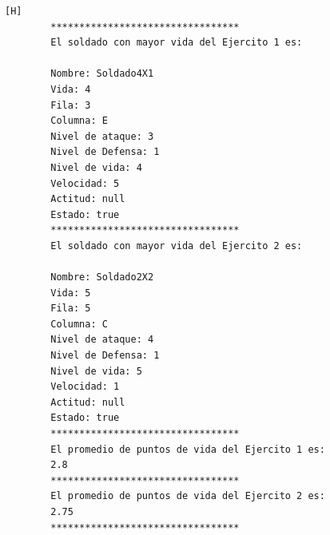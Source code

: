 \documentclass{article}
\begin{document}
	\begin{lstlisting}[language=bash,caption={Ejecucion:}][H]
		*********************************
		El soldado con mayor vida del Ejercito 1 es: 
		
		Nombre: Soldado4X1
		Vida: 4
		Fila: 3
		Columna: E
		Nivel de ataque: 3
		Nivel de Defensa: 1
		Nivel de vida: 4
		Velocidad: 5
		Actitud: null
		Estado: true
		*********************************
		El soldado con mayor vida del Ejercito 2 es: 
		
		Nombre: Soldado2X2
		Vida: 5
		Fila: 5
		Columna: C
		Nivel de ataque: 4
		Nivel de Defensa: 1
		Nivel de vida: 5
		Velocidad: 1
		Actitud: null
		Estado: true
		*********************************
		El promedio de puntos de vida del Ejercito 1 es: 
		2.8
		*********************************
		El promedio de puntos de vida del Ejercito 2 es: 
		2.75
		*********************************
		
	\end{lstlisting}
\end{document}
